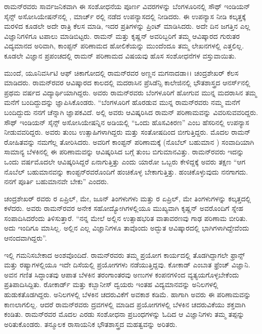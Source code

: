 ರಾಮನ್‍ರವರು ಸಾರ್ವಜನಿಕವಾಗಿ ಈ ಸಂಶೋಧನೆಯ ಪೂರ್ಣ ವಿವರಗಳನ್ನು ಬೆಂಗಳೂರಿನಲ್ಲಿ ಸೌಥ್ ಇಂಡಿಯನ್ ಸೈನ್ಸ್ ಅಸೋಸಿಯೇಷನ್‍ನಲ್ಲಿ ,  ಮಾರ್ಚ್ ರಲ್ಲಿ ನಡೆದ ಉಪನ್ಯಾಸದಲ್ಲಿ ನೀಡಿದರು. ಈ ಉಪನ್ಯಾಸ ನೀಡಿ ಕಲ್ಕತ್ತಕ್ಕೆ ಮರಳಿದ ಕೂಡಲೇ ಅದೇ ರಾತ್ರಿ ಕೆಲಸ ಮಾಡಿ, ಇದರ  ಪ್ರತಿಗಳನ್ನು ಪ್ರಿಂಟ್ ಮಾಡಿಸಿದರು. ಅದೇ ದಿನ ಜಗತ್ತಿನ ಎಲ್ಲ ವಿಜ್ಞಾನಿಗಳಿಗೂ ಟಪಾಲು ಮಾಡಿಬಿಟ್ಟರು. ರಾಮನ್ ಮತ್ತು ಕೃಷ್ಣನ್ ಅವರಿಬ್ಬರಿಗೆ ತಮ್ಮ ಆವಿಷ್ಕಾರದ ಗುರುತರ ವಿದ್ಯಮಾನದ ಅರಿವಾಗಿ, ಕಾಂಪ್ಟನ್ ಪರಿಣಾಮದ ಹೋಲಿಕೆಯನ್ನು ಮುಂದೆಂದೂ ತಮ್ಮ ಲೇಖನಗಳಲ್ಲಿ ಎತ್ತಲಿಲ್ಲ. ಕೂಡಲೇ ವಿಜ್ಞಾನ ಪ್ರಪಂಚದಲ್ಲಿ ರಾಮನ್ ಪರಿಣಾಮದ ವಿಷಯವು ಹೊಸ ಸಂಶೋಧನೆಗಳ ವಸ್ತುವಾಯಿತು.

ಮುಂದೆ, ಯೂನಿವರ್ಸಿಟಿ ಆಫ್ ಚಿಕಾಗೋದಲ್ಲಿ ರಾಮನ್‍ರವರ ಅಣ್ಣನ ಮಗನಾದ\break ಡಾ।। ಚಂದ್ರಶೇಖರ್ ಕೆಲಸ ಮಾಡಿದರು. ರಾಮನ್‍ರವರ ಆವಿಷ್ಕಾರದ ಕಾಲದಲ್ಲಿ ಮದರಾಸಿನ ಪ್ರೆಸಿಡೆನ್ಸಿ ಕಾಲೇಜಿನಲ್ಲಿ ಭೌತಶಾಸ್ತ್ರದ ಆನರ್ಸ್‌ನಲ್ಲಿ ಪ್ರಥಮ ವರ್ಷದ ವಿದ್ಯಾರ್ಥಿಯಾಗಿದ್ದರು. ಅವರು ರಾಮನ್‍ರವರು ಬೆಂಗಳೂರಿಗೆ ಹೋಗುವ ಮುನ್ನ ಮದರಾಸಿನ ತಮ್ಮ ಮನೆಗೆ ಬಂದಿದ್ದುದನ್ನು ಜ್ಞಾಪಿಸಿಕೊಂಡರು. “ಬೆಂಗಳೂರಿಗೆ ಹೊರಡುವ ಮುನ್ನ ರಾಮನ್‍ರವರು ನಮ್ಮ ಮನೆಗೆ ಬಂದಿದ್ದುದು ನನಗೆ ಚೆನ್ನಾಗಿ ಜ್ಞಾಪಕವಿದೆ. ಅಲ್ಲಿ ಅವರು ಆವಿಷ್ಕರಿಸಿದ ರಾಮನ್ ಪರಿಣಾಮವನ್ನು ವಿವರಿಸುವವರಿದ್ದರು. ಸೌಥ್ ಇಂಡಿಯನ್ ಸೈನ್ಸ್ ಅಸೋಸಿಯೇಷನ್ನಿನ ಅಡಿಯಲ್ಲಿ “ಒಂದು ಹೊಸವಿಕಿರಣ” ಎಂಬ ಹೆಸರಿನಲ್ಲಿ ಉಪನ್ಯಾಸ ನೀಡುವವರಿದ್ದರು. ಅವರು ತುಂಬ ಉತ್ಸಾಹಿಗಳಾಗಿದ್ದರು ಮತ್ತು ಸಂತೋಷದಿಂದ ಬೀಗುತ್ತಿದ್ದರು. ಮೊದಲ ರಾಮನ್ ರೋಹಿತವನ್ನು ನಮಗೆಲ್ಲ ತೋರಿಸಿದರು. ಅವರಿಗೆ ಕಾಂಪ್ಟನ್ ಪರಿಣಾಮಕ್ಕೆ (ನೊಬೆಲ್ ಬಹುಮಾನ ) ಸಂವಾದಿಯಾಗಿ ಸಾಮಾನ್ಯ ಬೆಳಕಿನಲ್ಲಿ ಈ ಪರಿಣಾಮವನ್ನು ಆವಿಷ್ಕರಿಸಿದ ಬಗ್ಗೆ ತುಂಬ ಬಿಗುಮಾನವಿತ್ತು. ರಾಮನ್‍ರವರು ಇದನ್ನು ಒಂದು ವರ್ಷಮೊದಲೇ ಆವಿಷ್ಕರಿಸಿದ್ದರೆ ಏನಾಗುತ್ತಿತ್ತು ಎಂದು ಯಾರೋ ಒಬ್ಬರು ಕೇಳಿದ್ದಕ್ಕೆ ಅವರು ತಕ್ಷಣ “ಆಗ ನೊಬೆಲ್ ಬಹುಮಾನವನ್ನು ಕಾಂಪ್ಟನ್‍ರವರೊಂದಿಗೆ ಹಂಚಿಕೊಳ್ಳ ಬೇಕಾಗುತ್ತಿತ್ತು. ಹಂಚಿಕೊಳ್ಳುವುದು ನನಗಾಗದು. ನನಗೆ ಪೂರ್ತಿ ಬಹುಮಾನವೇ ಬೇಕು” ಎಂದರು. 

ಚಂದ್ರಶೇಖರ್ ರವರು  ರ ಏಪ್ರಿಲ್, ಮೇ, ಜೂನ್ ತಿಂಗಳುಗಳು ಮತ್ತು  ರ ಏಪ್ರಿಲ್, ಮೇ ತಿಂಗಳುಗಳನ್ನು ಕಲ್ಕತ್ತದಲ್ಲಿ ಕಳೆದರು. ಅವರು ರಾಮನ್‍ರವರ ಅನೇಕ ಸಹೋದ್ಯೋಗಿಗಳಲ್ಲಿಯೂ ಮುಖ್ಯವಾಗಿ ಕೃಷ್ಣನ್ ಅವರೊಂದಿಗೆ ಸ್ನೇಹ ಸಂಪಾದಿಸಿದರೆಂದು ತಿಳಿಸುತ್ತಾರೆ. “ನನ್ನ ಮೇಲೆ ಅಲ್ಲಿನ ಉತ್ಸಾಹಭರಿತ ವಾತಾವರಣವು ಗಾಢ ಪರಿಣಾಮ ಬೀರಿತು. ಅದು ಇಂದಿಗೂ ಮಾಸಿಲ್ಲ. ಅಲ್ಲಿನ ಎಲ್ಲ ವಿಜ್ಞಾನಿಗಳೂ ತಾವೊಂದು ಅದ್ಭುತ ಆವಿಷ್ಕಾರದಲ್ಲಿ ಭಾಗಿಗಳಾಗಿದ್ದೇವೆಂದು ಆನಂದವಾಗಿದ್ದರು”.

ಇಲ್ಲಿ ಗಮನಿಸಬೇಕಾದ ಅಂಶವೊಂದಿದೆ. ರಾಮನ್‍ರವರು ತಮ್ಮ ಪ್ರಯೋಗ ಕಾರ್ಯದಲ್ಲಿ ತೊಡಗಿದ್ದಾಗಲೇ ಫ್ರಾನ್ಸ್ ಮತ್ತು ರಷ್ಯಾಗಳಲ್ಲಿಯೂ ಇದೇ ದಿಸೆಯಲ್ಲಿ ಪ್ರಯೋಗಗಳು ನಡೆಯುತ್ತಿದ್ದವು. ಕೋಕಾಡ್ ಎಂಬಾತ ಫ್ರೆಂಚ್ ವಿಜ್ಞಾನಿ. ಅವನ ಗಣಿತ ಸಿದ್ಧಾಂತವು ಆಪಾತ ಬೆಳಕಿನ ತರಂಗಾಂತರವು ಅಣುಗಳ ಕಂಪನಗಳಿಂದ ವ್ಯತ್ಯಯಗೊಳ್ಳಬೇಕೆಂದು ಪ್ರತಿಪಾದಿಸಿದ್ದಿತು. ರೋಕಾರ್ಡ್ ಮತ್ತು ಕಬ್ಬಾನೀಸ್ ದ್ವಯರು ಇಂತಹ ವಿದ್ಯಮಾನವನ್ನು ಅನಿಲಗಳಲ್ಲಿ ಹುಡುಕತೊಡಗಿದ್ದರು. ಅನಿಲಗಳಲ್ಲಿ ಬೆಳಕಿನ ಚದರುವಿಕೆಗೆ ಅವಕಾಶ ಕಡಿಮೆ. ಹಾಗಾಗಿ ಅವರು ಈ ಪರಿಣಾಮವನ್ನು ಕಾಣಲಾಗಲಿಲ್ಲ. ಆದರೆ ರಾಮನ್‍ರವರು ದ್ರವಗಳಲ್ಲಿ ಮಾಡಿದ ಪ್ರಯೋಗಗಳಲ್ಲಿ ಬೆಳಕಿನ ಚದರುವಿಕೆಯು ಶಕ್ತವಾಗಿ ಕಂಡಿತು. ರಾಮನ್‍ರವರ ಮೊದಲ ಎರಡು ಸಂಶೋಧನಾ ಪ್ರಬಂಧಗಳನ್ನು ಓದಿದ ಆ ವಿಜ್ಞಾನಿಗಳು ತಮ್ಮ ತಪ್ಪನ್ನು ಅರಿತುಕೊಂಡರು. ತನ್ಮೂಲಕ ರಾಸಾಯನಿಕ ಭೌತಶಾಸ್ತ್ರದ ಮಹತ್ವವನ್ನು ಅರಿತರು.

